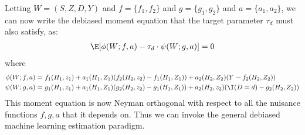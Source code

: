 Letting $W=(S, Z, D, Y)$ and $f=\{f_1, f_2\}$ and $g=\{g_1, g_2\}$ and $a=\{a_1, a_2\}$, we can now write the debiased moment equation that the target parameter $\tau_d$ must also satisfy, as:
\begin{align}
    \E[{\phi}(W;f, a) - \tau_d\cdot  {\psi}(W; g, a)] = 0
\end{align}
where
\begin{equation}\label{eqn:psi}
\begin{aligned}
    {\phi}(W; f,a) =~& {f}_1(H_1, z_1) + {a}_1(H_1, Z_1) ({f}_2(H_2, z_2) - {f}_1(H_1, Z_1)) + {a}_2(H_2, Z_2)(Y - {f}_2(H_2, Z_2))\\
    {\psi}(W; g, a) =~& {g}_1(H_1, z_1) + {a}_1(H_1, Z_1) ({g}_2(H_2, z_2) - {g}_1(H_1, Z_1)) + {a}_2(H_2, z_2)(\I(D=d) - {g}_2(H_2, Z_2))
\end{aligned}
\end{equation}
This moment equation is now Neyman orthogonal with respect to all the nuisance functions $f, g, a$ that it depends on. Thus we can invoke the general debiased machine learning estimation paradigm.

